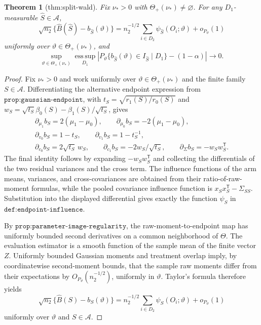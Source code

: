 \documentclass{article}
\newtheorem{theorem}{Theorem}
\begin{document}
\begin{theorem}[thm:split-wald]\label{thm:split-wald}
Fix \(\nu_*>0\) with \(\Theta_+(\nu_*)\ne\varnothing\). For any \(D_1\)-measurable \(\widehat S\in\mathcal A\), \[\sqrt{n_2}\{\widehat B(\widehat S)-b_{\widehat S}(\vartheta)\}=n_2^{-1/2}\sum_{i\in D_2}\psi_{\widehat S}(O_i;\vartheta)+o_{P_{\vartheta}}(1)\] uniformly over \(\vartheta\in\Theta_+(\nu_*)\), and \[\sup_{\vartheta\in\Theta_+(\nu_*)}\operatorname*{ess\,sup}_{D_1}\left|P_{\vartheta}\{b_{\widehat S}(\vartheta)\in I_{\widehat S}\mid D_1\}-(1-\alpha)\right|\to0.\]
\end{theorem}
\begin{proof}
Fix \(\nu_*>0\) and work uniformly over \(\vartheta\in\Theta_+(\nu_*)\) and the finite family \(S\in\mathcal A\).  Differentiating the alternative endpoint expression from \(\texttt{prop:gaussian-endpoint}\), with
\(t_S=\sqrt{r_1(S)/r_0(S)}\) and
\(w_S=\sqrt{t_S}\beta_0(S)-\beta_1(S)/\sqrt{t_S}\), gives
\[
\begin{gathered}
 \partial_{\mu_1}b_S=2(\mu_1-\mu_0),\qquad
 \partial_{\mu_0}b_S=-2(\mu_1-\mu_0),\\
 \partial_{v_0}b_S=1-t_S,\qquad
 \partial_{v_1}b_S=1-t_S^{-1},\\
 \partial_{c_0}b_S=2\sqrt{t_S}\,w_S,\qquad
 \partial_{c_1}b_S=-2w_S/\sqrt{t_S},\qquad
 \partial_{\Sigma}b_S=-w_Sw_S^{\mathsf T}.
\end{gathered}
\]
The final identity follows by expanding
\(-w_Sw_S^{\mathsf T}\) and collecting the differentials of the two residual variances and the cross term.  The influence functions of the arm means, variances, and cross-covariances are obtained from their ratio-of-raw-moment formulas, while the pooled covariance influence function is
\(x_Sx_S^{\mathsf T}-\Sigma_{SS}\).  Substitution into the displayed differential gives exactly the function \(\psi_S\) in \(\texttt{def:endpoint-influence}\).

By \(\texttt{prop:parameter-image-regularity}\), the raw-moment-to-endpoint map has uniformly bounded second derivatives on a common neighborhood of \(\Theta\).  The evaluation estimator is a smooth function of the sample mean of the finite vector \(Z\).  Uniformly bounded Gaussian moments and treatment overlap imply, by coordinatewise second-moment bounds, that the sample raw moments differ from their expectations by \(O_{P_\vartheta}(n_2^{-1/2})\), uniformly in \(\vartheta\).  Taylor's formula therefore yields
\[
 \sqrt{n_2}\{\widehat B(S)-b_S(\vartheta)\}
 =n_2^{-1/2}\sum_{i\in D_2}\psi_S(O_i;\vartheta)+o_{P_\vartheta}(1)
\]
uniformly over \(\vartheta\) and \(S\in\mathcal A\).


\end{proof}
\end{document}
